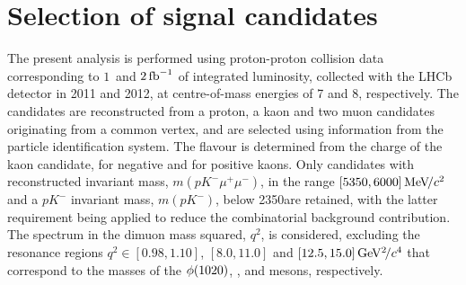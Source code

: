 \section{Selection of signal candidates}
\label{sec:sel}

The present analysis is performed using proton-proton collision data corresponding to \mbox{$1$ and} $2\mbox{\,fb}^{-1}$ of integrated luminosity, collected with the LHCb detector in 2011 and 2012, at centre-of-mass energies of 7 and 8\tev, respectively. The \LK candidates are reconstructed from a proton, a kaon and two muon candidates originating from a common vertex, and are selected using information from the particle identification system. The \Lb flavour is determined from the charge of the kaon candidate, \ie \hspace{-4pt} \Lb for negative and \Lbbar for positive kaons.
%
Only candidates with reconstructed invariant mass, $m(pK^-\mu^+\mu^-)$, in the range $[5350,6000]{\mathrm{\,Me\kern -0.1em V\!/}c^2}$ and a $pK^-$ invariant mass, $m(pK^-)$, below 2350\mevcc are retained, with the latter requirement being applied to reduce the combinatorial background contribution. The spectrum in the dimuon mass squared, $q^2$, is considered, excluding the resonance regions
$q^2 \in [0.98,1.10]$, $[8.0,11.0]$ and $[12.5,15.0]{\mathrm{\,Ge\kern -0.1em V^2\!/}c^4}$ that correspond to the masses of the $\phi(1020)$, \jpsi, and \psitwos mesons, respectively.

